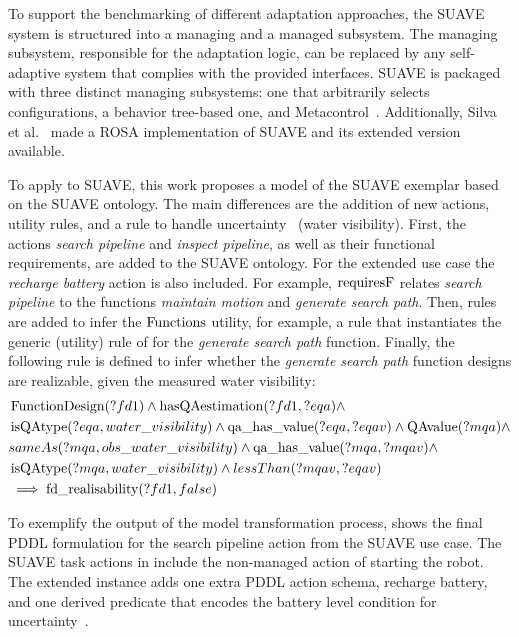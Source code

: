 To support the benchmarking of different adaptation approaches, the SUAVE system is structured into a managing and a managed subsystem. The managing subsystem, responsible for the adaptation logic, can be replaced by any self-adaptive system that complies with the provided interfaces. SUAVE is packaged with three distinct managing subsystems: one that arbitrarily selects configurations, a behavior tree-based one, and  Metacontrol~\cite{bozhinoski2022mros}. Additionally, Silva et al.~\cite{rosa} made a ROSA implementation of SUAVE and its extended version available.

To apply \planta to SUAVE, this work proposes a \pddltomasys model of the SUAVE exemplar based on the SUAVE \tomasys ontology. The main differences are the addition of new actions, utility rules, and a rule to handle uncertainty \Utwo~(water visibility). First, the actions \emph{search pipeline} and \emph{inspect pipeline}, as well as their functional requirements, are added to the SUAVE ontology. For the extended use case the \emph{recharge battery} action is also included. For example, $\operatorname{requiresF}$ relates \emph{search pipeline} to the functions \emph{maintain motion} and \emph{generate search path}. Then, rules are added to infer the $\operatorname{Functions}$ utility, for example, a rule that instantiates the generic (utility) rule of  for the \emph{generate search path} function. Finally, the following rule is defined to infer whether the \emph{generate search path} function designs are realizable, given the measured water visibility:
\begin{align*}
    &\operatorname{FunctionDesign}(?fd1) \wedge
    \operatorname{hasQAestimation}(?fd1, ?eqa) \wedge \\
    &\operatorname{isQAtype}(?eqa, water\_visibility) \wedge
    \operatorname{qa\_has\_value}(?eqa, ?eqav) \wedge
    \operatorname{QAvalue}(?mqa) \wedge \\
    &sameAs(?mqa, obs\_water\_visibility) \wedge
    \operatorname{qa\_has\_value}(?mqa, ?mqav) \wedge \\
    &\operatorname{isQAtype}(?mqa, water\_visibility) \wedge
    lessThan(?mqav, ?eqav) \\
    &\implies \operatorname{fd\_realisability}(?fd1, false)
\end{align*}

To exemplify the output of the model transformation process,  shows the final PDDL formulation for the search pipeline action from the SUAVE use case. The SUAVE task actions in  include the non-managed action of starting the robot. The extended instance adds one extra PDDL action schema, recharge battery, and one derived predicate that encodes the battery level condition for uncertainty~\Uthree.

